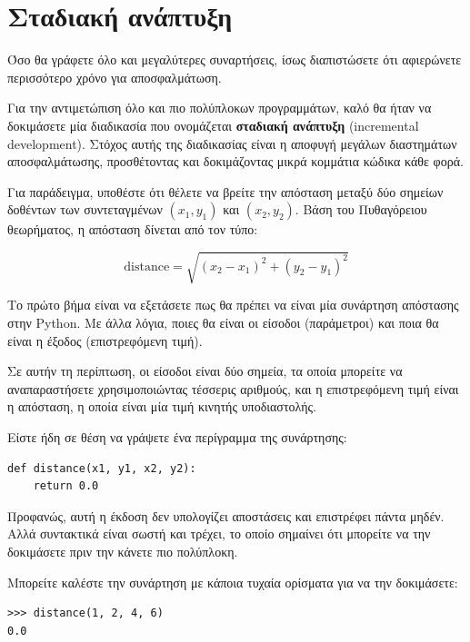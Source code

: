 \documentclass[10pt]{book}
\begin{document}
\section{Σταδιακή ανάπτυξη}
\label{incremental.development}

Όσο θα γράφετε όλο και μεγαλύτερες συναρτήσεις, ίσως διαπιστώσετε ότι
αφιερώνετε περισσότερο χρόνο για αποσφαλμάτωση.

Για την αντιμετώπιση όλο και πιο πολύπλοκων προγραμμάτων,
καλό θα ήταν να δοκιμάσετε μία διαδικασία που ονομάζεται
{\bf σταδιακή ανάπτυξη} (incremental development). Στόχος αυτής 
της διαδικασίας είναι η αποφυγή μεγάλων διαστημάτων αποσφαλμάτωσης,  
προσθέτοντας και δοκιμάζοντας μικρά κομμάτια κώδικα κάθε φορά.

Για παράδειγμα, υποθέστε ότι θέλετε να βρείτε την απόσταση μεταξύ
δύο σημείων δοθέντων των συντεταγμένων $(x_1, y_1)$ και $(x_2, y_2)$.
Βάση του Πυθαγόρειου θεωρήματος, η απόσταση δίνεται από τον τύπο:

\begin{displaymath}
\mathrm{distance} = \sqrt{(x_2 - x_1)^2 + (y_2 - y_1)^2}
\end{displaymath}
%

Το πρώτο βήμα είναι να εξετάσετε πως θα πρέπει να είναι μία συνάρτηση
απόστασης στην Python. Με άλλα λόγια, ποιες θα είναι οι είσοδοι (παράμετροι)
και ποια θα είναι η έξοδος (επιστρεφόμενη τιμή).

Σε αυτήν τη περίπτωση, οι είσοδοι είναι δύο σημεία, τα οποία μπορείτε να
αναπαραστήσετε χρησιμοποιώντας τέσσερις αριθμούς, και η επιστρεφόμενη τιμή
είναι η απόσταση, η οποία είναι μία τιμή κινητής υποδιαστολής.

Είστε ήδη σε θέση να γράψετε ένα περίγραμμα της συνάρτησης:

\begin{verbatim}
def distance(x1, y1, x2, y2):
    return 0.0
\end{verbatim}
%

Προφανώς, αυτή η έκδοση δεν υπολογίζει αποστάσεις και επιστρέφει πάντα
μηδέν. Αλλά συντακτικά είναι σωστή και τρέχει, το οποίο σημαίνει ότι
μπορείτε να την δοκιμάσετε πριν την κάνετε πιο πολύπλοκη.

Μπορείτε καλέστε την συνάρτηση με κάποια τυχαία ορίσματα για να την δοκιμάσετε:

\begin{verbatim}
>>> distance(1, 2, 4, 6)
0.0
\end{verbatim}
%
\end{document}
